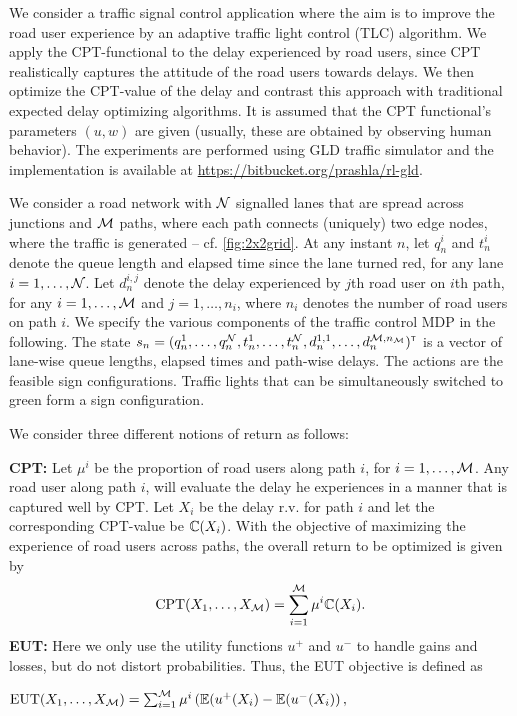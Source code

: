 We consider a traffic signal control application where the aim is to improve the road user experience by an adaptive traffic light control (TLC) algorithm.
We apply the CPT-functional to the delay experienced by road users, since CPT realistically captures the attitude of the road users towards delays. We then optimize the CPT-value of the delay and contrast this approach with traditional expected delay optimizing algorithms. It is assumed that the CPT functional's parameters $(u,w)$ are given (usually, these are obtained by observing human behavior). The experiments are performed using GLD traffic simulator \cite{GLDSim} and the implementation is available at \url{https://bitbucket.org/prashla/rl-gld}.

We consider a road network with $\mathcal{N}$ signalled lanes that are spread across junctions and $\mathcal{M}$ paths, where each path connects (uniquely) two edge nodes, where the traffic is generated -- cf. \cref{fig:2x2grid}. 
At any instant $n$, let $q_n^i$ and $t_n^i$ denote the queue length and elapsed time since the lane turned red, for any lane $i = 1,\ldots, \mathcal{N}$. Let $d_n^{i,j}$ denote the delay experienced by $j$th road user on $i$th path, for any $i=1,\ldots,\mathcal{M}$ and $j=1,\ldots,n_i$, where $n_i$ denotes the number of road users on path $i$.
We specify the various components of the traffic control MDP in the following.
The state $s_n=(q_n^1,\ldots,q_n^{\mathcal{N}},t_n^1,\ldots,t_n^{\mathcal{N}},d_n^{1,1},\ldots,d_n^{\mathcal{M},n_{\mathcal{M}}})^\mathsf{\scriptscriptstyle T}$ is a vector of lane-wise queue lengths, elapsed times and path-wise delays.
The actions are the feasible sign configurations. Traffic lights that can be simultaneously switched to green form a sign configuration. 

We consider three different notions of return as follows:

\textbf{CPT:} Let $\mu^i$ be the proportion of road users along path $i$, for $i=1,\ldots,\mathcal{M}$. Any road user along path $i$, will evaluate the delay he experiences in a manner that is captured well by CPT. Let $X_i$ be the delay r.v. for path $i$ and let the corresponding CPT-value be $\mathbb{C}(X_i)$. With the objective of maximizing the experience of road users across paths, the overall return to be optimized is given by
\begin{align}
\text{CPT}(X_1,\ldots,X_{\mathcal{M}}) = \sum_{i=1}^{\mathcal{M}} \mu^i \mathbb{C}(X_i).\label{eq:cpt-traffic}
\end{align}
\textbf{EUT:} Here we only use the utility functions $u^+$ and $u^-$ to handle gains and losses, but do not distort probabilities. 
Thus, the EUT objective is defined as\\
\begin{small}
\centerline{$\text{EUT}(X_1,\ldots,X_{\mathcal{M}}) = \sum_{i=1}^{\mathcal{M}} \mu^i \left(\mathbb{E}(u^+(X_i) - \mathbb{E}(u^-(X_i)\right),$}
  \end{small}
	
